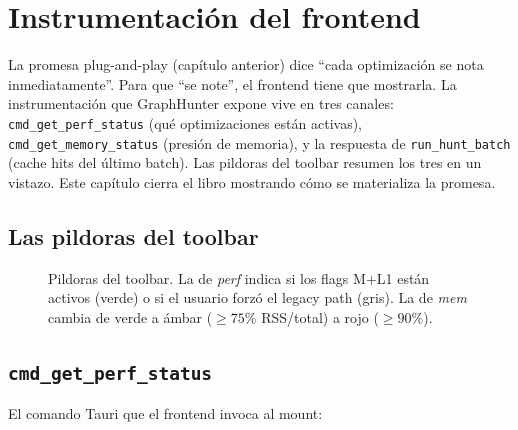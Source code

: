 \chapter{Instrumentación del frontend}
\label{cap:frontend-instr}

\begin{intuicion}
La promesa plug-and-play (capítulo anterior) dice ``cada
optimización se nota inmediatamente''. Para que ``se note'', el
frontend tiene que mostrarla. La instrumentación que GraphHunter
expone vive en tres canales: \texttt{cmd\_get\_perf\_status}
(qué optimizaciones están activas), \texttt{cmd\_get\_memory\_status}
(presión de memoria), y la respuesta de \texttt{run\_hunt\_batch}
(cache hits del último batch). Las pildoras del toolbar resumen
los tres en un vistazo. Este capítulo cierra el libro mostrando
cómo se materializa la promesa.
\end{intuicion}

\section{Las pildoras del toolbar}

\begin{figure}[H]
\centering
{}
\caption{Pildoras del toolbar. La de \emph{perf} indica si los
flags M+L1 están activos (verde) o si el usuario forzó el legacy
path (gris). La de \emph{mem} cambia de verde a ámbar
(\(\geq 75\%\) RSS/total) a rojo (\(\geq 90\%\)).}
\label{fig:plug-pills}
\end{figure}

\section{\texttt{cmd\_get\_perf\_status}}

El comando Tauri que el frontend invoca al mount:

